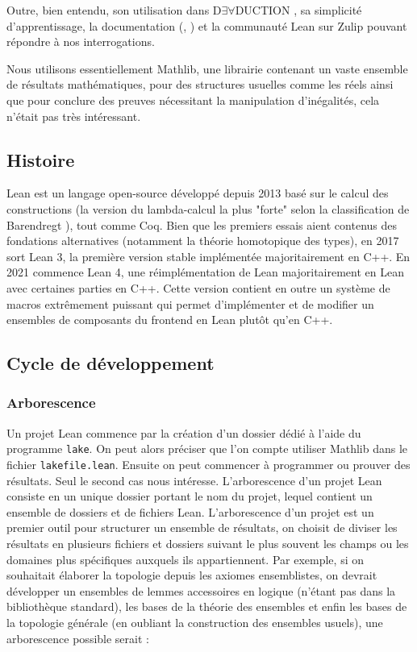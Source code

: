 \documentclass[a4paper, 12pt]{article}
\newcommand{\lean}[1]{\texttt{#1}}
\begin{document}
Outre, bien entendu, son utilisation dans D$\exists\forall$DUCTION \cite{deaduction}, sa simplicité d'apprentissage, la documentation (\cite{theorem_proving}, \cite{math_in_lean}) et la communauté Lean sur Zulip pouvant répondre à nos interrogations.

Nous utilisons essentiellement Mathlib, une librairie contenant un vaste ensemble de résultats mathématiques, pour des structures usuelles comme les réels ainsi que pour conclure des preuves nécessitant la manipulation d'inégalités, cela n'était pas très intéressant.

\subsection{Histoire}

Lean est un langage open-source développé depuis 2013 basé sur le calcul des constructions (la version du lambda-calcul la plus "forte" selon la classification de Barendregt \cite{Barendregt_1991}), tout comme Coq. Bien que les premiers essais aient contenus des fondations alternatives (notamment la théorie homotopique des types), en 2017 sort Lean 3, la première version stable implémentée majoritairement en C++. En 2021 commence Lean 4, une réimplémentation de Lean majoritairement en Lean avec certaines parties en C++. Cette version contient en outre un système de macros extrêmement puissant qui permet d'implémenter et de modifier un ensembles de composants du frontend en Lean plutôt qu'en C++.

\subsection{Cycle de développement}

\subsubsection{Arborescence}

Un projet Lean commence par la création d'un dossier dédié à l'aide du programme \lean{lake}. On peut alors préciser que l'on compte utiliser Mathlib dans le fichier \lean{lakefile.lean}. Ensuite on peut commencer à programmer ou prouver des résultats. Seul le second cas nous intéresse. L'arborescence d'un projet Lean consiste en un unique dossier portant le nom du projet, lequel contient un ensemble de dossiers et de fichiers Lean. L'arborescence d'un projet est un premier outil pour structurer un ensemble de résultats, on choisit de diviser les résultats en plusieurs fichiers et dossiers suivant le plus souvent les champs ou les domaines plus spécifiques auxquels ils appartiennent. Par exemple, si on souhaitait élaborer la topologie depuis les axiomes ensemblistes, on devrait développer un ensembles de lemmes accessoires en logique (n'étant pas dans la bibliothèque standard), les bases de la théorie des ensembles et enfin les bases de la topologie générale (en oubliant la construction des ensembles usuels), une arborescence possible serait :
\end{document}
